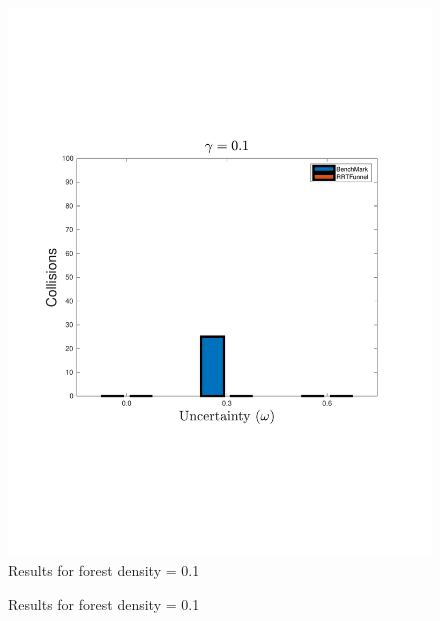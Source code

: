 \begin{figure}
  \centering \includegraphics[scale=.5]{figures/experiments/ResultPlot01}
  \caption{Results for forest density = 0.1}
  \label{fig:result0.1}
\end{figure}

\begin{figure}
  \centering {}
  \caption{Results for forest density = 0.1}
  \label{fig:result0.2}
\end{figure}
